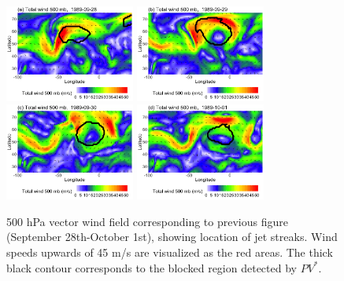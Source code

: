 \documentclass[smallextended]{svjour3}       %
\numberwithin{equation}{section}
\begin{document}
\begin{figure}
\centering
\includegraphics[width=0.38\textwidth]{fig9a}
\includegraphics[width=0.38\textwidth]{fig9b}\\
\includegraphics[width=0.38\textwidth]{fig9c}
\includegraphics[width=0.38\textwidth]{fig9d}
\caption{500 hPa vector wind field corresponding to previous figure (September 28th-October 1st), showing location of jet streaks. Wind speeds upwards of 45 m/s are visualized as the red areas. The thick black contour corresponds to the blocked region detected by $PV^*$.}\label{windfield}
\end{figure}
\end{document}
